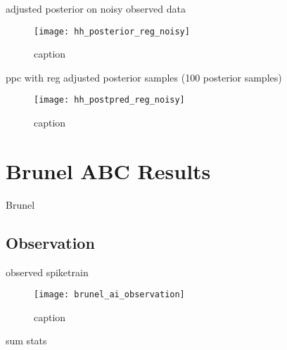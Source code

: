 adjusted posterior on noisy observed data

\begin{figure}[H]
    \centering
    \texttt{[image: hh\_posterior\_reg\_noisy]}
    \caption{caption}
    \label{fig:fig1}
\end{figure} 

ppc with reg adjusted posterior samples (100 posterior samples)


\begin{figure}[H]
    \centering
    \texttt{[image: hh\_postpred\_reg\_noisy]}
    \caption{caption}
    \label{fig:fig1}
\end{figure}



\chapter{Brunel ABC Results}

Brunel 

\section{Observation}

observed spiketrain 

\begin{figure}[H]
    \centering
    \texttt{[image: brunel\_ai\_observation]}
    \caption{caption}
    \label{fig:fig1}
\end{figure}

sum stats

